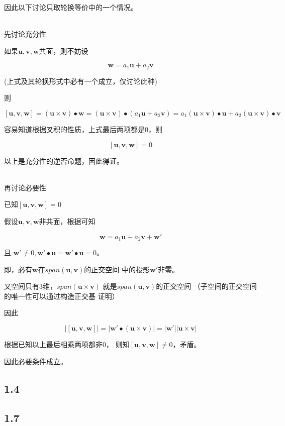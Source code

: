 \documentclass[UTF8,zihao=5]{ctexart}
\newcommand{\bm}[1]{{\mathbf{#1}}}
\begin{document}
因此以下讨论只取轮换等价中的一个情况。

~\\

先讨论充分性

如果$\bm{u},\bm{v},\bm{w}$共面，则不妨设

$$
\bm{w}=a_1\bm{u}+a_2\bm{v}
$$

(上式及其轮换形式中必有一个成立，仅讨论此种)

则

$$
[\bm{u},\bm{v},\bm{w}]=
(\bm{u}\times\bm{v})\bullet\bm{w}
=(\bm{u}\times\bm{v})\bullet(a_1\bm{u}+a_2\bm{v})
=a_1(\bm{u}\times\bm{v})\bullet\bm{u}+
a_2(\bm{u}\times\bm{v})\bullet\bm{v}
$$

容易知道根据叉积的性质，上式最后两项都是0，则

$$
[\bm{u},\bm{v},\bm{w}]=0
$$

以上是充分性的逆否命题，因此得证。

~\\

再讨论必要性

已知$[\bm{u},\bm{v},\bm{w}]=0$

假设$\bm{u},\bm{v},\bm{w}$非共面，根据可知

$$
\bm{w}=a_1\bm{u}+a_2\bm{v}+\bm{w'}
$$

且
$
\bm{w'}\neq 0, 
\bm{w'}\bullet\bm{u}=\bm{w'}\bullet\bm{u}=0
$。

即，必有$\bm{w}$在$span(\bm{u},\bm{v})$的正交空间
中的投影$\bm{w'}$非零。

又空间只有3维，$span(\bm{u}\times\bm{v})$
就是$span(\bm{u},\bm{v})$的正交空间
（子空间的正交空间的唯一性可以通过构造正交基
证明）

因此

$$
\left|[\bm{u},\bm{v},\bm{w}]\right|
=\left|\bm{w'}\bullet(\bm{u}\times\bm{v})\right|
=|\bm{w'}||\bm{u}\times\bm{v}|
$$

根据已知以上最后相乘两项都非0，
则知$[\bm{u},\bm{v},\bm{w}]\neq 0$，矛盾。

因此必要条件成立。

\subsection*{1.4}



\subsection*{1.7}
\end{document}
